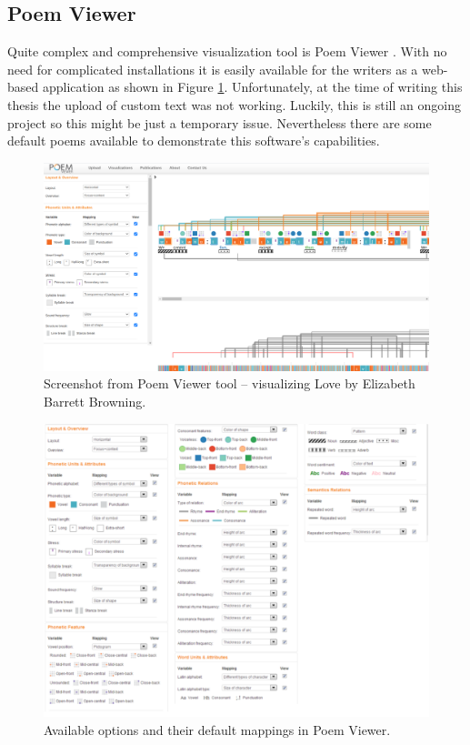 \subsection{Poem Viewer}
Quite complex and comprehensive visualization tool is Poem Viewer \cite{Abdul2013}. With no need for complicated installations it is easily available for the writers as a web-based application as shown in Figure \ref{screenshotPV}. Unfortunately, at the time of writing this thesis the upload of custom text was not working. Luckily, this is still an ongoing project so this might be just a temporary issue. Nevertheless there are some default poems available to demonstrate this software's capabilities.
\begin{figure}[h]\centering
	\includegraphics[scale=0.24]{../img/ScreenshotPV.png}
	\caption{Screenshot from Poem Viewer tool -- visualizing Love by Elizabeth Barrett Browning.}\label{screenshotPV}
\end{figure}

\begin{figure}[h]\centering
	\includegraphics[scale=0.4]{../img/snapshotPV_options.pdf}
	\caption{Available options and their default mappings in Poem Viewer.}\label{screenshotPV-options}
\end{figure}


